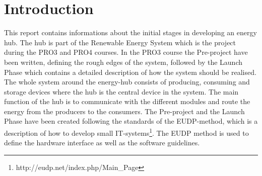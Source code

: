
\chapter{Introduction}

This report contains informations about the initial stages in developing an energy hub. The hub is part of the Renewable Energy System which is the project during the PRO3 and PRO4 courses. In the PRO3 course the Pre-project have been written, defining the rough edges of the system, followed by the Launch Phase which contains a detailed description of how the system should be realised. 
\p The whole system around the energy-hub consists of producing, consuming and storage devices where the hub is the central device in the system. The main function of the hub is to communicate with the different modules and route the energy from the producers to the consumers.
\p The Pre-project and the Launch Phase have been created following the standards of the EUDP-method, which is a description of how to develop small IT-systems\footnote{http://eudp.net/index.php/Main\_Page}. The EUDP method is used to define the hardware interface as well as the software guidelines. 

\newpage
